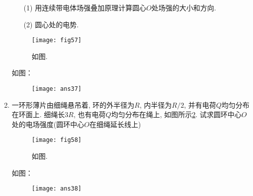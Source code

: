 \begin{enumerate}
\begin{enumerate}
        \item[(1)] 用连续带电体场强叠加原理计算圆心$O$处场强的大小和方向.
        \item[(2)] 圆心处的电势.
    \end{enumerate}
    \begin{figure}[H]
        \centering
        \texttt{[image: fig57]}
        \caption{如图.}\label{Fig:57}
    \end{figure}
     \begin{solution}
        如图：
        \begin{figure}[H]
            \centering
            \texttt{[image: ans37]}
        \end{figure}
    \end{solution}
    \item  一环形薄片由细绳悬吊着, 环的外半径为$R$, 内半径为$R/2$, 并有电荷$Q$均匀分布在环面上. 细绳长$3R$, 也有电荷$Q$均匀分布在绳上, 如图所示\ref{Fig:58}. 试求圆环中心$O$处的电场强度(圆环中心$O$在细绳延长线上)
    \begin{figure}[H]
        \centering
        \texttt{[image: fig58]}
        \caption{如图.}\label{Fig:58}
    \end{figure}
    \begin{solution}
        如图：
        \begin{figure}[H]
            \centering
            \texttt{[image: ans38]}
        \end{figure}
    \end{solution}
\end{enumerate}